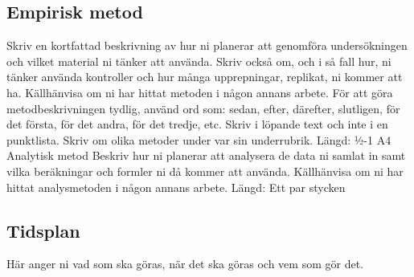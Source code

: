 \subsection{Empirisk metod}
Skriv en kortfattad beskrivning av hur ni planerar att genomföra undersökningen och vilket material ni tänker att använda. Skriv också om, och i så fall hur, ni tänker använda kontroller och hur många upprepningar, replikat, ni kommer att ha. Källhänvisa om ni har hittat metoden i någon annans arbete. För att göra metodbeskrivningen tydlig, använd ord som: sedan, efter, därefter, slutligen, för det första, för det andra, för det tredje, etc. Skriv i löpande text och inte i en punktlista. Skriv om olika metoder under var sin underrubrik.
Längd: ½-1 A4
Analytisk metod
Beskriv hur ni planerar att analysera de data ni samlat in samt vilka beräkningar och formler ni då kommer att använda. Källhänvisa om ni har hittat analysmetoden i någon annans arbete.
Längd: Ett par stycken

\subsection{Tidsplan}
Här anger ni vad som ska göras, när det ska göras och vem som gör det.